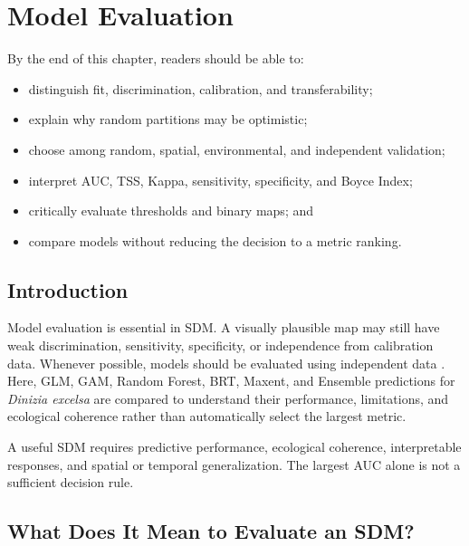 \chapter[Model Evaluation]{Model Evaluation}

\begin{objetivos}
By the end of this chapter, readers should be able to:
\begin{itemize}
\item distinguish fit, discrimination, calibration, and transferability;
\item explain why random partitions may be optimistic;
\item choose among random, spatial, environmental, and independent validation;
\item interpret AUC, TSS, Kappa, sensitivity, specificity, and Boyce Index;
\item critically evaluate thresholds and binary maps; and
\item compare models without reducing the decision to a metric ranking.
\end{itemize}
\end{objetivos}

\section{Introduction}

Model evaluation is essential in SDM. A visually plausible map may still have
weak discrimination, sensitivity, specificity, or independence from calibration
data. Whenever possible, models should be evaluated using independent data
\parencite{fielding1997review,allouche2006assessing,hirzel2006evaluating,li2013thresholds,guisan2017habitat}.
Here, GLM, GAM, Random Forest, BRT, Maxent, and Ensemble predictions for
\textit{Dinizia excelsa} are compared to understand their performance,
limitations, and ecological coherence rather than automatically select the
largest metric.

\begin{conceito}[title={\faBook\quad Evaluation is not merely ranking}]
A useful SDM requires predictive performance, ecological coherence,
interpretable responses, and spatial or temporal generalization. The largest
AUC alone is not a sufficient decision rule.
\end{conceito}

\section{What Does It Mean to Evaluate an SDM?}

